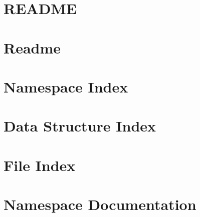 \documentclass[twoside]{book}
\newcommand{\+}{\discretionary{\mbox{\scriptsize$\hookleftarrow$}}{}{}}
\begin{document}
\chapter{R\+E\+A\+D\+ME}
\label{md_s2n-master_README}
\hypertarget{md_s2n-master_README}{}

\chapter{Readme}
\label{md_s2n-master_tests_fuzz_Readme}
\hypertarget{md_s2n-master_tests_fuzz_Readme}{}

\chapter{Namespace Index}

\chapter{Data Structure Index}

\chapter{File Index}

\chapter{Namespace Documentation}


\end{document}
